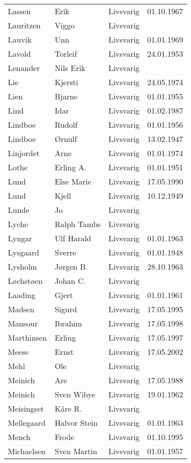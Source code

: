 \documentclass[fsbok.tex]{subfiles}
\begin{document}
\begin{longtable}{llll}
Lassen	&	Erik	&	Livsvarig 	&	01.10.1967	\\
Lauritzen	&	Viggo	&	Livsvarig 	&		\\
Lauvik	&	Unn	&	Livsvarig 	&	01.01.1969	\\
Lavold	&	Torleif	&	Livsvarig 	&	24.01.1953	\\
Lenander	&	Nils Erik	&	Livsvarig 	&		\\
Lie	&	Kjersti	&	Livsvarig 	&	24.05.1974	\\
Lien	&	Bjarne	&	Livsvarig 	&	01.01.1955	\\
Lind	&	Idar	&	Livsvarig 	&	01.02.1987	\\
Lindboe	&	Rudolf	&	Livsvarig 	&	01.01.1956	\\
Lindboe	&	Ørnulf	&	Livsvarig 	&	13.02.1947	\\
Linjordet	&	Arne	&	Livsvarig 	&	01.01.1974	\\
Lothe	&	Erling A.	&	Livsvarig 	&	01.01.1951	\\
Lund	&	Else Marie	&	Livsvarig 	&	17.05.1990	\\
Lund	&	Kjell	&	Livsvarig 	&	10.12.1949	\\
Lunde	&	Jo	&	Livsvarig 	&		\\
Lyche	&	Ralph Tambs	&	Livsvarig 	&		\\
Lyngar	&	Ulf Harald	&	Livsvarig 	&	01.01.1963	\\
Lysgaard	&	Sverre	&	Livsvarig 	&	01.01.1948	\\
Lysholm	&	Jørgen B.	&	Livsvarig 	&	28.10.1963	\\
Løchstøen	&	Johan C.	&	Livsvarig 	&		\\
Laading	&	Gjert	&	Livsvarig 	&	01.01.1961	\\
Madsen 	&	Sigurd 	&	Livsvarig 	&	17.05.1995	\\
Mansour 	&	Ibrahim	&	Livsvarig	&	17.05.1998	\\
Marthinsen 	&	Erling	&	Livsvarig	&	17.05.1997	\\
Meese 	&	Ernst	&	Livsvarig	&	17.05.2002	\\
Mehl	&	Ole	&	Livsvarig 	&		\\
Meinich	&	Are	&	Livsvarig 	&	17.05.1988	\\
Meinich	&	Sven Wibye	&	Livsvarig 	&	19.01.1962	\\
Meisingset	&	Kåre R.	&	Livsvarig 	&		\\
Mellegaard	&	Halvor Stein	&	Livsvarig 	&	01.01.1963	\\
Mench 	&	Frode	&	Livsvarig	&	01.10.1995	\\
Michaelsen	&	Sven Martin	&	Livsvarig 	&	01.01.1957	\\

\end{longtable}
\end{document}
